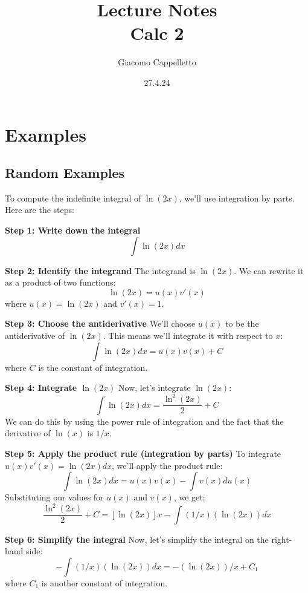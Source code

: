 \documentclass{report}
\title{\Huge{Lecture Notes}\\Calc 2}
\author{\huge{Giacomo Cappelletto}}
\date{27.4.24}
\begin{document}

\maketitle
\newpage
{}
\tableofcontents
\pagebreak

\chapter{Examples}
\section{Random Examples}

\sol To compute the indefinite integral of $\ln(2x)$, we'll use integration by parts. Here are the steps:

\textbf{Step 1: Write down the integral}
$$\int \ln(2x) dx$$

\textbf{Step 2: Identify the integrand}
The integrand is $\ln(2x)$. We can rewrite it as a product of two functions:
$$\ln(2x) = u(x)v'(x)$$
where $u(x) = \ln(2x)$ and $v'(x) = 1$.

\textbf{Step 3: Choose the antiderivative}
We'll choose $u(x)$ to be the antiderivative of $\ln(2x)$. This means we'll integrate it with respect to $x$:
$$\int \ln(2x) dx = u(x)v(x) + C$$
where $C$ is the constant of integration.

\textbf{Step 4: Integrate $\ln(2x)$}
Now, let's integrate $\ln(2x)$:
$$\int \ln(2x) dx = \frac{\ln^2(2x)}{2} + C$$
We can do this by using the power rule of integration and the fact that the derivative of $\ln(x)$ is $1/x$.

\textbf{Step 5: Apply the product rule (integration by parts)}
To integrate $u(x)v'(x) = \ln(2x) dx$, we'll apply the product rule:
$$\int \ln(2x) dx = u(x)v(x) - \int v(x) du(x)$$
Substituting our values for $u(x)$ and $v(x)$, we get:
$$\frac{\ln^2(2x)}{2} + C = \left[\ln(2x)\right] x - \int (1/x)(\ln(2x)) dx$$

\textbf{Step 6: Simplify the integral}
Now, let's simplify the integral on the right-hand side:
$$-\int (1/x)(\ln(2x)) dx = -(\ln(2x))/x + C_1$$
where $C_1$ is another constant of integration.
\end{document}
